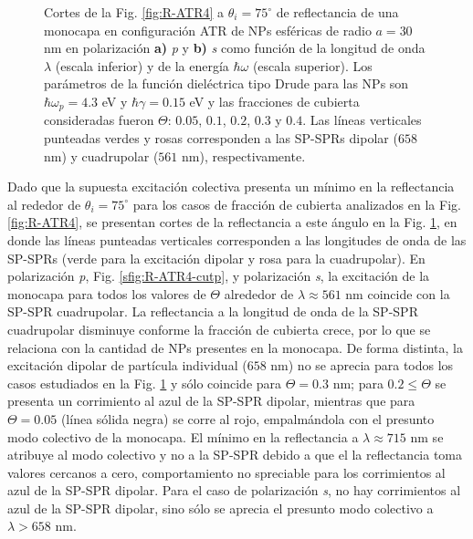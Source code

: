 \begin{figure}[h!]
	\caption{Cortes de la Fig. \ref{fig:R-ATR4} a $\theta_i = 75^\circ$ de reflectancia de una monocapa en configuración ATR de NPs esféricas de radio $a=30$ nm en polarización \textbf{a)} \emph{p} y \textbf{b)} \emph{s} como función de la longitud de onda $\lambda$ (escala inferior) y de la energía $\hbar\omega$ (escala superior). Los parámetros de la función dieléctrica tipo Drude para las NPs son $\hbar\omega_p = 4.3$ eV y $\hbar\gamma = 0.15$ eV y las fracciones de cubierta consideradas fueron $\Theta$: $0. 05$, $0. 1$, $0. 2$, $0. 3$ y $0. 4$. Las líneas verticales punteadas verdes y rosas corresponden a las SP-SPRs dipolar ($658$ nm) y cuadrupolar ($561$ nm), respectivamente. }\label{fig:R-ATR4-Cuts}
	\end{figure}	  

Dado que la supuesta excitación colectiva presenta un mínimo en la reflectancia  al rededor de $\theta_i = 75^\circ$ para los casos de fracción de cubierta analizados en la Fig.  \ref{fig:R-ATR4}, se presentan cortes de la reflectancia a este ángulo en la Fig. \ref{fig:R-ATR4-Cuts}, en donde las líneas punteadas verticales corresponden a las longitudes de onda de las SP-SPRs (verde para la excitación dipolar y rosa para la cuadrupolar). En polarización \emph{p}, Fig. \ref{sfig:R-ATR4-cutp}, y polarización \emph{s}, la excitación de la monocapa para todos los valores de $\Theta$ alrededor de $\lambda \approx 561$ nm coincide con la SP-SPR cuadrupolar.  La reflectancia a la longitud de onda de la SP-SPR cuadrupolar disminuye conforme la fracción de cubierta crece, por lo que se relaciona con la cantidad de NPs presentes en la monocapa. De forma distinta, la excitación dipolar de partícula individual ($658$ nm) no se aprecia para todos los casos estudiados en la Fig. \ref{fig:R-ATR4-Cuts} y sólo coincide para $\Theta=0.3$ nm; para $0.2\leq \Theta$ se presenta un corrimiento al azul de la SP-SPR dipolar, mientras que para $\Theta=0.05$ (línea sólida negra) se corre al rojo, empalmándola con el presunto modo colectivo de la monocapa. El mínimo en la reflectancia a $\lambda\approx 715$ nm  se atribuye al modo colectivo y no a la SP-SPR debido a que el la reflectancia toma valores cercanos a cero, comportamiento no spreciable para los corrimientos al azul de la SP-SPR dipolar. Para el caso de polarización \emph{s}, no hay corrimientos al azul de la SP-SPR dipolar, sino sólo se aprecia el presunto modo colectivo a $\lambda>658$ nm.

